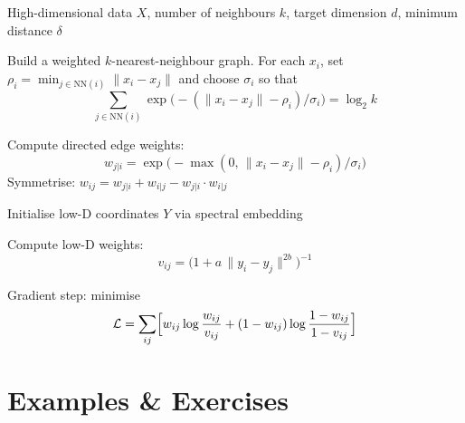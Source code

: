 \vspace{1.5em}
\begin{algorithm}[H]
\caption{UMAP. Like t-SNE, all points are updated simultaneously and the objective is non-convex. The spectral initialisation makes results more reproducible than t-SNE's random start, but does not guarantee a global optimum. Key parameters: \texttt{n\_neighbors} (typically 15--200) controls local versus global structure, analogous to perplexity in t-SNE; \texttt{min\_dist} (typically 0.1--0.5) controls how tightly points cluster in the embedding.}
\begin{algorithmic}[1]
\Require High-dimensional data $X$, number of neighbours $k$, target dimension $d$, minimum distance $\delta$

\State Build a weighted $k$-nearest-neighbour graph.
For each $x_i$, set $\rho_i = \min_{j \in \text{NN}(i)} \|x_i - x_j\|$ and choose $\sigma_i$ so that
\[
  \sum_{j \in \text{NN}(i)} \exp\!\bigl(-(\|x_i - x_j\| - \rho_i) / \sigma_i\bigr) = \log_2 k
\]

\State Compute directed edge weights:
\[
  w_{j|i} = \exp\!\bigl(-\max(0,\, \|x_i - x_j\| - \rho_i) / \sigma_i\bigr)
\]
Symmetrise: $w_{ij} = w_{j|i} + w_{i|j} - w_{j|i} \cdot w_{i|j}$

\State Initialise low-D coordinates $Y$ via spectral embedding

\Repeat

    \State Compute low-D weights:
    \[
      v_{ij} = \bigl(1 + a\,\|y_i - y_j\|^{2b}\bigr)^{-1}
    \]

    \State Gradient step: minimise
    \[
      \mathcal{L} = \sum_{ij}\Bigl[ w_{ij}\log\frac{w_{ij}}{v_{ij}} + (1-w_{ij})\log\frac{1-w_{ij}}{1-v_{ij}} \Bigr]
    \]

\end{algorithmic}
\end{algorithm}











\newpage

\section{Examples \& Exercises}

